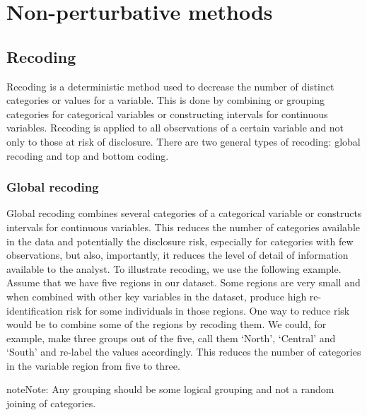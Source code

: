 \documentclass[letterpaper,10pt,english]{sphinxmanual}
\begin{document}
\section{Non-perturbative methods}
\label{\detokenize{anon_methods:non-perturbative-methods}}

\subsection{Recoding}
\label{\detokenize{anon_methods:recoding}}
Recoding is a deterministic method used to decrease the number of
distinct categories or values for a variable. This is done by combining
or grouping categories for categorical variables or constructing
intervals for continuous variables. Recoding is applied to all
observations of a certain variable and not only to those at risk of
disclosure. There are two general types of recoding: global recoding and
top and bottom coding.


\subsubsection{Global recoding}
\label{\detokenize{anon_methods:global-recoding}}
Global recoding combines several categories of a categorical variable or
constructs intervals for continuous variables. This reduces the number
of categories available in the data and potentially the disclosure risk,
especially for categories with few observations, but also, importantly,
it reduces the level of detail of information available to the analyst.
To illustrate recoding, we use the following example. Assume that we
have five regions in our dataset. Some regions are very small and when
combined with other key variables in the dataset, produce high
re-identification risk for some individuals in those regions. One way to
reduce risk would be to combine some of the regions by recoding them. We
could, for example, make three groups out of the five, call them
‘North’, ‘Central’ and ‘South’ and re-label the values accordingly. This
reduces the number of categories in the variable region from five to
three.

\begin{sphinxadmonition}{note}{Note:}
Any grouping should be some logical grouping and not a
random joining of categories.
\end{sphinxadmonition}
\end{document}
